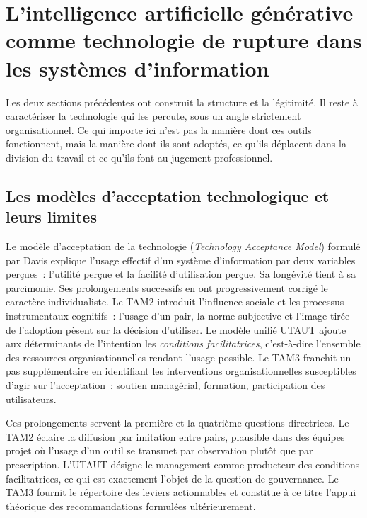 \section{L'intelligence artificielle générative comme technologie de rupture dans les
systèmes d'information}

Les deux sections précédentes ont construit la structure et la légitimité. Il reste à
caractériser la technologie qui les percute, sous un angle strictement organisationnel. Ce
qui importe ici n'est pas la manière dont ces outils fonctionnent, mais la manière dont ils
sont adoptés, ce qu'ils déplacent dans la division du travail et ce qu'ils font au jugement
professionnel.

\subsection{Les modèles d'acceptation technologique et leurs limites}

Le modèle d'acceptation de la technologie (\textit{Technology Acceptance Model}) formulé par
Davis \cite{davis1989} explique l'usage effectif d'un système d'information par deux
variables perçues~: l'utilité perçue et la facilité d'utilisation perçue. Sa longévité tient
à sa parcimonie. Ses prolongements successifs en ont progressivement corrigé le caractère
individualiste. Le TAM2 \cite{venkatesh2000} introduit l'influence sociale et les processus
instrumentaux cognitifs~: l'usage d'un pair, la norme subjective et l'image tirée de
l'adoption pèsent sur la décision d'utiliser. Le modèle unifié UTAUT \cite{venkatesh2003}
ajoute aux déterminants de l'intention les \textit{conditions facilitatrices},
c'est-à-dire l'ensemble des ressources organisationnelles rendant l'usage possible. Le TAM3
\cite{venkatesh2008} franchit un pas supplémentaire en identifiant les interventions
organisationnelles susceptibles d'agir sur l'acceptation~: soutien managérial, formation,
participation des utilisateurs.

Ces prolongements servent la première et la quatrième questions directrices. Le TAM2 éclaire
la diffusion par imitation entre pairs, plausible dans des équipes projet où l'usage d'un
outil se transmet par observation plutôt que par prescription. L'UTAUT désigne le
management comme producteur des conditions facilitatrices, ce qui est exactement l'objet de
la question de gouvernance. Le TAM3 fournit le répertoire des leviers actionnables et
constitue à ce titre l'appui théorique des recommandations formulées ultérieurement.

